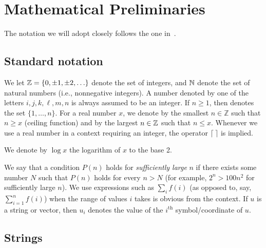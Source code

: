 \setcounter{chapter}{-1}
\chapter{Mathematical Preliminaries}
\label{ch:mathematical-preliminaries}

The notation we will adopt closely follows the one in~\citet{Arora2009}.

\section*{Standard notation}
We let $\mathbb{Z} = \{0,\pm1,\pm2,\ldots\}$ denote the set of integers, and
$\mathbb{N}$ denote the set of natural numbers (i.e., nonnegative integers).
A number denoted by one of the letters $i,j,k,\ell,m,n$ is always assumed to be an integer.
If $n \geq 1$, then  denotes the set $\{1,\ldots,n\}$.
For a real number $x$, we denote by  the smallest $n \in \mathbb{Z}$ such that $n \geq x$ (ceiling function) and by  the largest $n \in \mathbb{Z}$ such that $n \leq x$.
Whenever we use a real number in a context requiring an integer, the operator $\lceil \ \rceil$ is implied.

We denote by $\log x$ the logarithm of $x$ to the base 2.

We say that a condition $P(n)$ holds for \emph{sufficiently large} $n$ if there exists some number $N$
such that $P(n)$ holds for every $n > N$ (for example, $2^n > 100n^2$ for sufficiently large $n$).
We use expressions such as $\sum_i f(i)$ (as opposed to, say, $\sum_{i=1}^n f(i)$) when the range
of values $i$ takes is obvious from the context.
If $u$ is a string or vector, then $u_i$ denotes the value of the $i^{\text{th}}$ symbol/coordinate of $u$.


\section*{Strings}

